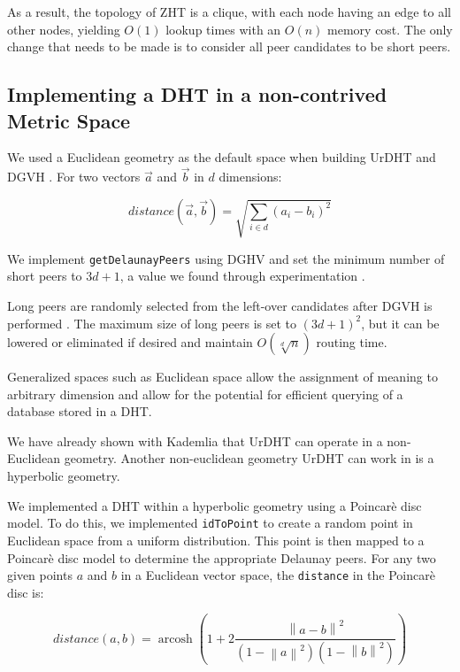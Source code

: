 \documentclass[11pt,conference]{IEEEtran}
\begin{document}
As a result, the topology of ZHT is a clique, with each node having an edge to all other nodes, yielding $ O(1) $ lookup times with an $ O(n) $ memory cost.
%
The only change that needs to be made is to consider all peer candidates to be short peers.

\subsection{Implementing a DHT in a non-contrived Metric Space}

We used a Euclidean geometry as the default space when building UrDHT and DGVH \cite{dgvh}.
For two vectors $\vec{a}$ and $\vec{b}$ in $d$ dimensions: 

\[distance\left(\vec{a}, \vec{b}\right) = \sqrt{\sum\limits_{i\in d} \left(a_i-b_i\right)^2}\]


We implement \texttt{getDelaunayPeers} using DGHV and set the minimum number of short peers to $3d+1$, a value we found through experimentation \cite{dgvh}.

Long peers are randomly selected from the left-over candidates after DGVH is performed \cite{dgvh}.
The maximum size of long peers is set to $(3d+1)^2$, but it can be lowered or eliminated if desired and maintain $ O(\sqrt[d]{n}) $ routing time.


Generalized spaces such as Euclidean space allow the assignment of meaning to arbitrary dimension and allow for the potential for efficient querying of a database stored in a DHT.

	
\label{sec:hyper}

We have already shown with Kademlia that UrDHT can operate in a non-Euclidean geometry.
Another non-euclidean geometry UrDHT can work in is a hyperbolic geometry.

We implemented a DHT within a hyperbolic geometry using a Poincar\`{e} disc model.
To do this, we implemented \texttt{idToPoint} to create a random point in Euclidean space from a uniform distribution.
This point is then mapped to a Poincar\`{e} disc model to determine the appropriate Delaunay peers.
For any two given points $a$ and $b$ in a Euclidean vector space, the \texttt{distance} in the  Poincar\`{e} disc is:


\[ distance(a, b) = \operatorname{arcosh} \left(  1+ 2 \frac{ \left\| a - b \right\| ^{2} }{ ( 1 - \left\| a \right\| ^{2} ) ( 1 - \left\| b \right\| ^{2} ) }\right) \]
\end{document}
